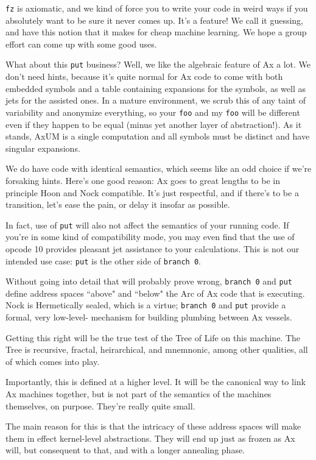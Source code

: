 \documentclass[twoside]{article}
\begin{document}
\texttt{fz} is axiomatic, and we kind of force you to write your code in weird ways if you absolutely want to be sure it never comes up. It's a feature! We call it guessing, and have this notion that it makes for cheap machine learning. We hope a group effort can come up with some good uses. 

What about this \texttt{put} business? Well, we like the algebraic feature of Ax a lot. We don't need hints, because it's quite normal for Ax code to come with both embedded symbols and a table containing expansions for the symbols, as well as jets for the assisted ones. In a mature environment, we scrub this of any taint of variability and anonymize everything, so your \texttt{foo} and my \texttt{foo} will be different even if they happen to be equal (minus yet another layer of abstraction!). As it stands, AxUM is a single computation and all symbols must be distinct and have singular expansions.

We do have code with identical semantics, which seems like an odd choice if we're forsaking hints. Here's one good reason: Ax goes to great lengths to be in principle Hoon and Nock compatible. It's just respectful, and if there's to be a transition, let's ease the pain, or delay it insofar as possible.

In fact, use of \texttt{put} will also not affect the semantics of your running code. If you're in some kind of compatibility mode, you may even find that the use of opcode 10 provides pleasant jet assistance to your calculations. This is not our intended use case: \texttt{put} is the other side of \texttt{branch 0}.

Without going into detail that will probably prove wrong, \texttt{branch 0} and \texttt{put} define address spaces ``above" and ``below" the Arc of Ax code that is executing. Nock is Hermetically sealed, which is a virtue; \texttt{branch 0} and \texttt{put} provide a formal, very low-level- mechanism for building plumbing between Ax vessels. 

Getting this right will be the true test of the Tree of Life on this machine. The Tree is recursive, fractal, heirarchical, and mnemnonic, among other qualities, all of which comes into play.

Importantly, this is defined at a higher level. It will be the canonical way to link Ax machines together, but is not part of the semantics of the machines themselves, on purpose. They're really quite small. 

The main reason for this is that the intricacy of these address spaces will make them in effect kernel-level abstractions. They will end up just as frozen as Ax will, but consequent to that, and with a longer annealing phase. 
\end{document}

